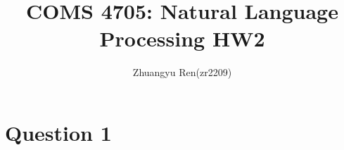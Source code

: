 \documentclass[12pt]{article}
\begin{document}
 
 
 
\title{COMS 4705: Natural Language Processing HW2}%
%
\author{Zhuangyu Ren(zr2209)\\ %
} %
 
\maketitle
 \indent 
\section*{Question 1}
\end{document}

